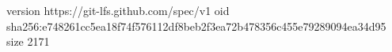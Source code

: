 version https://git-lfs.github.com/spec/v1
oid sha256:e748261cc5ea18f74f576112df8beb2f3ea72b478356c455e79289094ea34d95
size 2171
